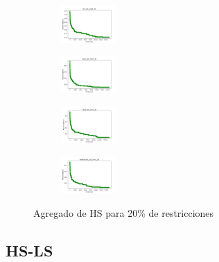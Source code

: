 \begin{figure}[H]
\begin{subfigure}
        \centering
        \includegraphics[width=0.234\textwidth]{img/hs/iris_set_const_20_3773969821_cost.png}
    \end{subfigure}
    \hfill
    \begin{subfigure}
        \centering
        \includegraphics[width=0.234\textwidth]{img/hs/ecoli_set_const_20_3773969821_cost.png}
    \end{subfigure}
    \hfill
    \begin{subfigure}
        \centering
        \includegraphics[width=0.234\textwidth]{img/hs/rand_set_const_20_3773969821_cost.png}
    \end{subfigure}
    \hfill
    \begin{subfigure}
        \centering
        \includegraphics[width=0.234\textwidth]{img/hs/newthyroid_set_const_20_3773969821_cost.png}
    \end{subfigure}
    \caption{Agregado de HS para 20\% de restricciones}
\end{figure}

\vspace*{\fill}
\newpage


\subsection{HS-LS}

